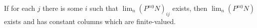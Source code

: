 If for each $j$ there is some $i$ such that $\lim_n (P^n {}^0N)_{ij}$ exists, then $\lim_n (P^n {}^0N)$ exists and has constant columns which are finite-valued.
